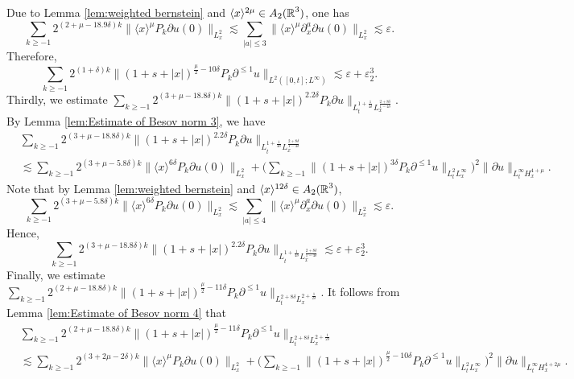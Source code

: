 \documentclass[11pt,twoside]{article}
\def\R{\mathop{\mathbb R\kern 0pt}\nolimits}
\def\f{\frac}
\def\p{\partial}
\def\ve{\varepsilon}
\def\ls{\lesssim}
\newcommand{\w}[1]{\langle {#1} \rangle}
\theoremstyle{plain}
\theoremstyle{definition}
\numberwithin{equation}{section}
\begin{document}
Due to Lemma \ref{lem:weighted bernstein} and $\w{x}^{2\mu}\in A_2(\R^3)$, one has
\begin{equation*}
	\sum_{k\ge -1}2^{(2 +\mu -18.9\delta) k}\|\w{x}^{\mu}P_k\partial u(0)\|_{L^2_x}
	\ls
	\sum_{|a|\le 3}\|\w{x}^{\mu}\p^a_x\partial u(0)\|_{L^2_x}\ls \ve.
\end{equation*}
Therefore,
\begin{equation}\label{5.7}
\sum_{k\ge-1}2^{(1+\delta) k}\|(1+s+|x|)^{\f{\mu}{2}-10\delta}P_k\p^{\le 1} u\|_{L^{2}([0,t];L^\infty)}\ls \ve+\ve^3_2.
\end{equation}
Thirdly, we estimate $\sum_{k\ge -1}2^{(3 +\mu -18.8\delta) k}\|(1+s+|x|)^{2.2\delta} P_{k}\p u\|_{L_t^{1+\f{1}{4\delta}}L^{\f{2+8\delta}{1-4\delta}}_x}$.
By Lemma \ref{lem:Estimate of Besov norm 3}, we have
\begin{equation}\label{improve23}
\begin{split}
	&\sum_{k\ge -1}2^{(3 +\mu -18.8\delta) k}\|(1+s+|x|)^{2.2\delta} P_{k}\p u\|_{L_t^{1+\f{1}{4\delta}}L^{\f{2+8\delta}{1-4\delta}}_x}\\
	&\ls
	\sum_{k\ge -1}2^{(3+\mu -5.8\delta) k}
	\|\w{x}^{6\delta}P_k\partial u(0)\|_{L^2_x}
	+
	\big(\sum_{k\ge -1}\|(1+s+|x|)^{3\delta}P_{k}\p^{\le 1} u\|_{L^2_tL^\infty_x}\big)^2
	\|\p u\|_{L^\infty_tH^{4+\mu}_x}.
\end{split}
\end{equation}
Note that by Lemma \ref{lem:weighted bernstein} and $\w{x}^{12\delta}\in A_2(\R^3)$,
\begin{equation*}
\sum_{k\ge -1}2^{(3+\mu -5.8\delta) k}
\|\w{x}^{6\delta}P_k\partial u(0)\|_{L^2_x}
\ls
\sum_{|a|\le 4}\|\w{x}^{\mu}\p^a_x\partial u(0)\|_{L^2_x}\ls \ve.
\end{equation*}
Hence,
\begin{equation}\label{5.10}
\sum_{k\ge -1}2^{(3 +\mu -18.8\delta) k}\|(1+s+|x|)^{2.2\delta} P_{k}\p u\|_{L_t^{1+\f{1}{4\delta}}L^{\f{2+8\delta}{1-4\delta}}_x}\ls \ve+\ve^3_2.
\end{equation}
Finally, we estimate $\sum_{k\ge-1}2^{(2 +\mu-18.8\delta) k} \|(1+s+|x|)^{\f{\mu}{2}-11\delta}P_{k}\p^{\le 1} u\|_{L_t^{2+8\delta}L^{2+\f{1}{2\delta}}_x}$.
It follows from Lemma \ref{lem:Estimate of Besov norm 4} that
\begin{equation*}
	\begin{split}
		&\sum_{k\ge -1}2^{(2 +\mu -18.8\delta) k}\|(1+s+|x|)^{\f{\mu}{2}-11\delta} P_{k}\p^{\le 1} u\|_{L_t^{2+8\delta}L^{2+\f{1}{2\delta}}_x}\\
		&\ls
		\sum_{k\ge -1}2^{(3+2\mu -2\delta) k}
		\|\w{x}^{\mu}P_k\partial u(0)\|_{L^2_x}
		+
		\big(\sum_{k\ge -1}\|(1+s+|x|)^{\f{\mu}{2}-10\delta}P_{k}\p^{\le 1} u\|_{L^2_tL^\infty_x}\big)^2
		\|\p u\|_{L^\infty_tH^{4+2\mu}_x}.
	\end{split}
\end{equation*}
\end{document}
